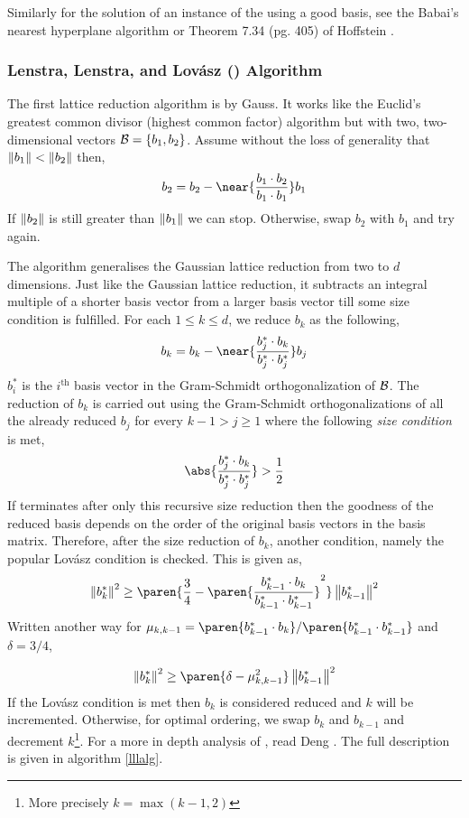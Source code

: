 \documentclass{homework}
\begin{document}
Similarly for the solution of an instance of the \CVP{} using a good
basis, see the Babai's nearest hyperplane algorithm
\cite{babai1986lovasz} or Theorem 7.34 (pg. 405) of Hoffstein
\cite{hoffstein2008introduction}.

\subsubsection{Lenstra, Lenstra, and Lov\'asz (\LLL) Algorithm} The
first lattice reduction algorithm is by Gauss. It works like the
Euclid's greatest common divisor (highest common factor) algorithm but
with two, two-dimensional vectors \ie $\mathcal{B} = \{b_1, b_2\}$. Assume
without the loss of generality that $\left\lVert b_1\right\rVert < \left\lVert b_2\right\rVert$ then,
\[
  b_2 = b_2 - \near{\frac{b_1 \cdot b_2}{b_1 \cdot b_1}}b_1
\]
If $\left\lVert b_2\right\rVert$ is still greater than $\left\lVert b_1\right\rVert$ we can
stop. Otherwise, swap $b_2$ with $b_1$ and try again.

The \LLL{} algorithm generalises the Gaussian lattice reduction from
two to $d$ dimensions. Just like the Gaussian lattice reduction, it
subtracts an integral multiple of a shorter basis vector from a larger
basis vector till some size condition is fulfilled. For each
$1 \leq k \leq d$, we reduce $b_k$ as the following,
\[
  b_k = b_k - \near{\frac{b_j^* \cdot b_k}{b_j^* \cdot b_j^*}}b_j
\]
$b_i^*$ is the $i^\text{th}$ basis vector in the Gram-Schmidt
orthogonalization of $\mathcal{B}$. The reduction of $b_k$ is carried out using
the Gram-Schmidt orthogonalizations of all the already reduced $b_j$
for every $k - 1 > j \geq 1$ where the following \textit{size
  condition} is met,
\[
  \abs{\frac{b_j^* \cdot b_k}{b_j^* \cdot b_j^*}} > \frac{1}{2}
\]
If \LLL{} terminates after only this recursive size reduction then the
goodness of the reduced basis depends on the order of the original
basis vectors in the basis matrix. Therefore, after the size reduction
of $b_k$, another condition, namely the popular Lov\'asz condition is
checked. This is given as,
\[
  \norm{b_k^*}^2 \geq \paren{
    \frac{3}{4} - \paren{
      \frac{b_{k-1}^* \cdot b_k}{b_{k-1}^* \cdot b_{k-1}^*}
    }^2
  }
  \norm{b_{k-1}^*}^2
\]
Written another way for $\mu_{k, k-1} =
\paren{b_{k-1}^* \cdot b_k}/
\paren{b_{k-1}^* \cdot b_{k-1}^*}$ and $\delta = 3/4$,

\[
  \norm{b_k^*}^2 \geq \paren{\delta - \mu_{k, k-1}^2}\norm{b_{k-1}^*}^2
\]
If the Lov\'asz condition is met then $b_k$ is considered reduced and
$k$ will be incremented. Otherwise, for optimal ordering, we swap
$b_k$ and $b_{k-1}$ and decrement $k$\footnote{More precisely
  $k = \max(k - 1, 2)$}. For a more in depth analysis of \LLL{}, read
Deng \cite{deng2016introduction}. The full description is given in
algorithm \ref{lllalg}.
\end{document}
